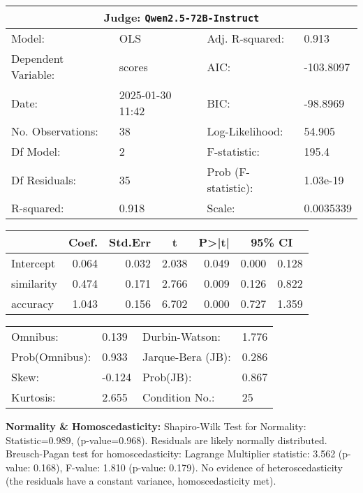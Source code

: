 \begin{center}
\small
\begin{tabular}{llll}
\toprule
\multicolumn{4}{c}{\textbf{Judge:} \texttt{Qwen2.5-72B-Instruct} \citep{qwen2025qwen25technicalreport}} \\
\midrule
Model: & OLS & Adj. R-squared: & 0.913 \\
Dependent Variable: & scores & AIC: & -103.8097 \\
Date: & 2025-01-30 11:42 & BIC: & -98.8969 \\
No. Observations: & 38 & Log-Likelihood: & 54.905 \\
Df Model: & 2 & F-statistic: & 195.4 \\
Df Residuals: & 35 & Prob (F-statistic): & 1.03e-19 \\
R-squared: & 0.918 & Scale: & 0.0035339 \\
\bottomrule
\end{tabular}

\vspace{5pt}
\begin{tabular}{lrrrrrr}
\toprule
 & \multicolumn{1}{c}{Coef.} & \multicolumn{1}{c}{Std.Err} & \multicolumn{1}{c}{t} & \multicolumn{1}{c}{P>|t|} & \multicolumn{2}{c}{95\% CI} \\
\midrule
Intercept & 0.064 & 0.032 & 2.038 & 0.049 & 0.000 & 0.128 \\
similarity & 0.474 & 0.171 & 2.766 & 0.009 & 0.126 & 0.822 \\
accuracy & 1.043 & 0.156 & 6.702 & 0.000 & 0.727 & 1.359 \\
\bottomrule
\end{tabular}

\vspace{5pt}
\begin{tabular}{@{}ll@{\hspace{15pt}}ll@{}}
\toprule
Omnibus: & 0.139 & Durbin-Watson: & 1.776 \\
Prob(Omnibus): & 0.933 & Jarque-Bera (JB): & 0.286 \\
Skew: & -0.124 & Prob(JB): & 0.867 \\
Kurtosis: & 2.655 & Condition No.: & 25 \\
\bottomrule
\end{tabular}
\end{center}

\textbf{Normality \& Homoscedasticity:} Shapiro-Wilk Test for Normality: Statistic=0.989, (p-value=0.968). 
Residuals are likely normally distributed. 
Breusch-Pagan test for homoscedasticity: 
Lagrange Multiplier statistic: 3.562 
(p-value: 0.168), 
F-value: 1.810
(p-value: 0.179). 
No evidence of heteroscedasticity (the residuals have a constant variance, homoscedasticity met).

